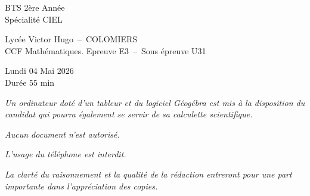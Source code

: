 \thispagestyle{empty}
    \begin{minipage}{0.2\linewidth}
    \begin{tcolorbox}[colback=white, title=, width=1\linewidth]	
        BTS 2ère Année \\
        Spécialité CIEL 
    \end{tcolorbox}
\end{minipage}\hfill
\begin{minipage}{0.54\linewidth}
    \begin{tcolorbox}[colback=white, title=, width=1\linewidth]	
        \begin{center}
            Lycée Victor Hugo~--~COLOMIERS \\
            CCF Mathématiques. Epreuve E3~--~Sous épreuve U31 
        \end{center}
        
    \end{tcolorbox}
\end{minipage}\hfill
\begin{minipage}{0.25\linewidth}
    \begin{tcolorbox}[colback=white, title=, width=1\linewidth]	
        \begin{center}
            Lundi 04 Mai 2026 \\
    Durée 55 min
        \end{center}
        
    \end{tcolorbox}
\end{minipage}\hfill

\vspace{2cm}

\NomPrenom{}

\vspace{2cm}

\begin{center}
    
\emph{Un ordinateur doté d'un tableur et du logiciel Géogébra est mis à la disposition du candidat qui pourra également se servir de sa calculette scientifique.}

\bigskip

\emph{Aucun document n'est autorisé.}

\bigskip

\emph{L'usage du téléphone est interdit.}

\bigskip

\emph{La clarté du raisonnement et la qualité de la rédaction entreront pour une part importante dans l'appréciation des copies.}

\end{center}

